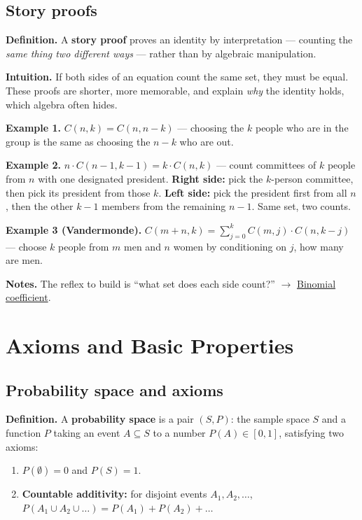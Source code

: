 \documentclass[11pt,a4paper]{article}
\begin{document}
\subsection{Story proofs}\label{sec:story-proofs}

\textbf{Definition.} A \textbf{story proof} proves an identity by interpretation --- counting the \textit{same thing two different ways} --- rather than by algebraic manipulation.

\textbf{Intuition.} If both sides of an equation count the same set, they must be equal. These proofs are shorter, more memorable, and explain \textit{why} the identity holds, which algebra often hides.

\textbf{Example 1.} $C(n, k) = C(n, n-k)$ --- choosing the $k$ people who are in the group is the same as choosing the $n-k$ who are out.

\textbf{Example 2.} $n \cdot  C(n-1, k-1) = k \cdot  C(n, k)$ --- count committees of $k$ people from $n$ with one designated president. \textbf{Right side:} pick the $k$-person committee, then pick its president from those $k$. \textbf{Left side:} pick the president first from all $n$, then the other $k-1$ members from the remaining $n-1$. Same set, two counts.

\textbf{Example 3 (Vandermonde).} $C(m+n, k) = \sum _{j=0}^{k} C(m, j)\cdot C(n, k-j)$ --- choose $k$ people from $m$ men and $n$ women by conditioning on $j$, how many are men.

\textbf{Notes.} The reflex to build is ``what set does each side count?'' $\to$ \hyperref[sec:binomial-coefficient]{Binomial coefficient}.


\section{Axioms and Basic Properties}

\subsection{Probability space and axioms}\label{sec:probability-space-and-axioms}

\textbf{Definition.} A \textbf{probability space} is a pair $(S, P)$: the sample space $S$ and a function $P$ taking an event $A \subseteq  S$ to a number $P(A) \in  [0, 1]$, satisfying two axioms:
\begin{enumerate}[leftmargin=1.4em]
\item $P(\emptyset ) = 0$ and $P(S) = 1$.
\item \textbf{Countable additivity:} for disjoint events $A_{1}, A_{2}, \ldots$, $P(A_{1} \cup  A_{2} \cup  \ldots ) = P(A_{1}) + P(A_{2}) + \ldots$
\end{enumerate}
\end{document}
